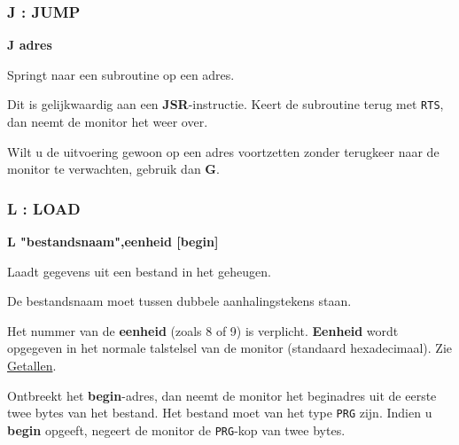 \subsubsection{J : JUMP}
\begin{description}[leftmargin=2cm,style=nextline]
\item [Formaat:] {\bf J adres}\item [Gebruik:] Springt naar een subroutine op een adres.

\item [Opmerkingen:] Dit is gelijkwaardig aan een {\bf JSR}-instructie. Keert de subroutine terug met {\tt RTS}, dan neemt de monitor het weer over.

    Wilt u de uitvoering gewoon op een adres voortzetten zonder terugkeer naar de monitor te verwachten, gebruik dan {\bf G}.

\end{description}


\subsubsection{L : LOAD}
\begin{description}[leftmargin=2cm,style=nextline]
\item [Formaat:] {\bf L "bestandsnaam",eenheid [begin]}\item [Gebruik:] Laadt gegevens uit een bestand in het geheugen.

\item [Opmerkingen:] De bestandsnaam moet tussen dubbele aanhalingstekens staan.

    Het nummer van de {\bf eenheid} (zoals 8 of 9) is verplicht. {\bf Eenheid} wordt opgegeven in het normale talstelsel van de monitor (standaard hexadecimaal). Zie \hyperref[sec:numbers]{Getallen}.

    Ontbreekt het {\bf begin}-adres, dan neemt de monitor het beginadres uit de eerste twee bytes van het bestand. Het bestand moet van het type {\tt PRG} zijn. Indien u {\bf begin} opgeeft, negeert de monitor de {\tt PRG}-kop van twee bytes.

\end{description}


